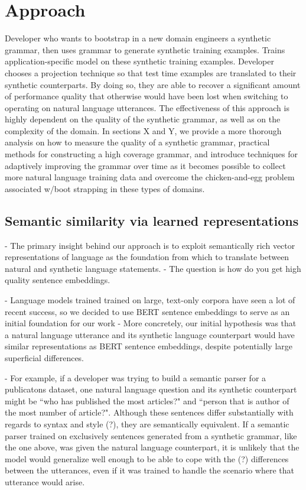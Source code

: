 \documentclass{article}
\begin{document}
\section{Approach}
Developer who wants to bootstrap in a new domain engineers a synthetic grammar, then uses grammar to generate synthetic training examples. Trains application-specific model on these synthetic training examples. Developer chooses a projection technique so that test time examples are translated to their synthetic counterparts. By doing so, they are able to recover a significant amount of performance quality that otherwise would have been lost when switching to operating on natural language utterances. The effectiveness of this approach is highly dependent on the quality of the synthetic grammar, as well as on the complexity of the domain. In sections X and Y, we provide a more thorough analysis on how to measure the quality of a synthetic grammar, practical methods for constructing a high coverage grammar, and introduce techniques for adaptively improving the grammar over time as it becomes possible to collect more natural language training data and overcome the chicken-and-egg problem associated w/boot strapping in these types of domains.  
\subsection{Semantic similarity via learned representations}
- The primary insight behind our approach is to exploit semantically rich vector representations of language as the foundation from which to translate between natural and synthetic language statements. 
- The question is how do you get high quality sentence embeddings. 

- Language models trained trained on large, text-only corpora have seen a lot of recent success, so we decided to use BERT sentence embeddings to serve as an initial foundation for our work
- More concretely, our initial hypothesis was that a natural language utterance and its synthetic language counterpart would have similar representations 
as BERT sentence embeddings, despite potentially large superficial differences.

- For example, if a developer was trying to build a semantic parser for a publicatons dataset, one natural language question and its synthetic counterpart might be ``who has published the most articles?" and ``person that is author of the most number of article?". Although these sentences differ substantially with regards to syntax and style (?), they are semantically equivalent. If a semantic parser  trained on exclusively sentences generated from a synthetic grammar, like the one above, was given the natural language counterpart, it is unlikely that the model would generalize well enough to be able to cope with the (?) differences between the utterances, even if it was trained to handle the scenario where that utterance would arise. 
\end{document}
